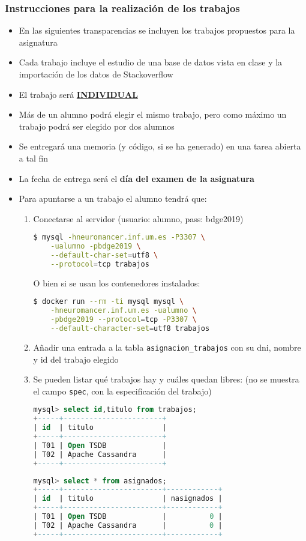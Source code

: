 \begin{frame}
  \frametitle{Instrucciones para la realización de los trabajos}
\begin{itemize}
\item En las siguientes transparencias se incluyen los trabajos propuestos
  para la asignatura
\item Cada trabajo incluye el estudio de una base de datos vista en clase y
  la importación de los datos de Stackoverflow
\item El trabajo será \underline{\bf INDIVIDUAL}
\item Más de un alumno podrá elegir el mismo trabajo, pero como máximo un
  trabajo podrá ser elegido por dos alumnos
\item Se entregará una memoria (y código, si se ha generado) en una tarea
  abierta a tal fin
\item La fecha de entrega será el {\bf día del examen de la asignatura}
\item Para apuntarse a un trabajo el alumno tendrá que:

  \framebreak

  \begin{enumerate}
  \item Conectarse al servidor (usuario: alumno, pass: bdge2019)
\begin{lstlisting}[language=bash]
$ mysql -hneuromancer.inf.um.es -P3307 \
    -ualumno -pbdge2019 \
    --default-char-set=utf8 \
    --protocol=tcp trabajos
  \end{lstlisting}
%
O bien si se usan los contenedores instalados:
%
\begin{lstlisting}[language=bash]
$ docker run --rm -ti mysql mysql \
    -hneuromancer.inf.um.es -ualumno \
    -pbdge2019 --protocol=tcp -P3307 \
    --default-character-set=utf8 trabajos
\end{lstlisting}

  \item Añadir una entrada a la tabla {\tt asignacion\_trabajos} con su
    dni, nombre y id del trabajo elegido
  \item Se pueden listar qué trabajos hay y cuáles quedan libres: (no se
    muestra el campo {\tt spec}, con la especificación del trabajo)
    \begin{lstlisting}[language=sql,basicstyle=\tiny\tt]
mysql> select id,titulo from trabajos;
+-----+-----------------------+
| id  | titulo                |
+-----+-----------------------+
| T01 | Open TSDB             |
| T02 | Apache Cassandra      |
+-----+-----------------------+
\end{lstlisting}
%
\begin{lstlisting}[language=sql,basicstyle=\tiny\tt]
mysql> select * from asignados;
+-----+-----------------------+------------+
| id  | titulo                | nasignados |
+-----+-----------------------+------------+
| T01 | Open TSDB             |          0 |
| T02 | Apache Cassandra      |          0 |
+-----+-----------------------+------------+
\end{lstlisting}
  \end{enumerate}


\end{itemize}
\end{frame}
